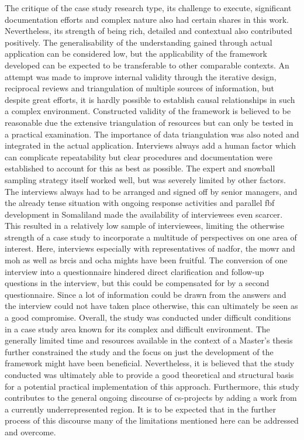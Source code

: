The critique of the case study research type, its challenge to execute, significant documentation efforts and complex nature also had certain shares in this work. Nevertheless, its strength of being rich, detailed and contextual also contributed positively. The generalisability of the understanding gained through actual application can be considered low, but the applicability of the framework developed can be expected to be transferable to other comparable contexts.\newline
An attempt was made to improve internal validity through the iterative design, reciprocal reviews and triangulation of multiple sources of information, but despite great efforts, it is hardly possible to establish causal relationships in such a complex environment. Constructed validity of the framework is believed to be reasonable due the extensive triangulation of resources but can only be tested in a practical examination. The importance of data triangulation was also noted and integrated in the actual application. Interviews always add a human factor which can complicate repeatability but clear procedures and documentation were established to account for this as best as possible. The expert and snowball sampling strategy itself worked well, but was severely limited by other factors. The interviews always had to be arranged and signed off by senior managers, and the already tense situation with ongoing response activities and parallel \acrshort{fbf} development in Somaliland made the availability of interviewees even scarcer. This resulted in a relatively low sample of interviewees, limiting the otherwise strength of a case study to incorporate a multitude of perspectives on one area of interest. Here, interviews especially with representatives of \acrshort{nadfor}, the \acrshort{mowr} and \acrshort{moh} as well as \acrshort{brcis} and \acrshort{ocha} mights have been fruitful. The conversion of one interview into a questionnaire hindered direct clarification and follow-up questions in the interview, but this could be compensated for by a second questionnaire. Since a lot of information could be drawn from the answers and the interview could not have taken place otherwise, this can ultimately be seen as a good compromise.\newline
Overall, the study was conducted under difficult conditions in a case study area known for its complex and difficult environment. The generally limited time and resources available in the context of a Master's thesis further constrained the study and the focus on just the development of the framework might have been beneficial. Nevertheless, it is believed that the study conducted was ultimately able to provide a good theoretical and structural basis for a potential practical implementation of this approach. Furthermore, this study contributes to the general ongoing discourse of \acrlong{cs}-projects by adding a work from a currently underrepresented region. It is to be expected that in the further process of this discourse many of the limitations mentioned here can be addressed and overcome.

